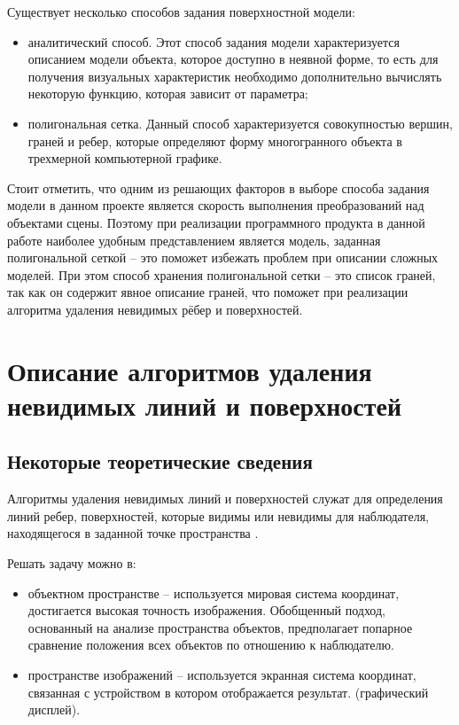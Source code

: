 Существует несколько способов задания поверхностной модели:
\begin{itemize} 
\item аналитический способ. Этот способ задания модели характеризуется описанием модели объекта, которое доступно в неявной форме, то есть для получения визуальных характеристик необходимо дополнительно вычислять некоторую функцию, которая зависит от параметра;

\item полигональная сетка. Данный способ характеризуется совокупностью вершин, граней и ребер, которые определяют форму многогранного объекта в трехмерной компьютерной графике.
\end{itemize}

Стоит отметить, что одним из решающих факторов в выборе способа задания модели в данном проекте является скорость выполнения преобразований над объектами сцены. Поэтому при реализации программного продукта в данной работе наиболее удобным представлением является модель, заданная полигональной сеткой -- это поможет избежать проблем при описании сложных моделей. При этом способ хранения полигональной сетки -- это список граней, так как он содержит явное описание граней, что поможет при реализации алгоритма удаления невидимых рёбер и поверхностей. 


\section{Описание алгоритмов удаления невидимых линий и поверхностей}

\subsection {Некоторые теоретические сведения}

Алгоритмы удаления невидимых линий и поверхностей служат для определения линий ребер, поверхностей, которые видимы или невидимы для наблюдателя, находящегося в заданной точке пространства \cite{rogers}.

Решать задачу можно в:
\begin{itemize}
	\item объектном пространстве -- используется мировая система координат, достигается высокая точность изображения. Обобщенный подход, основанный на анализе пространства объектов, предполагает попарное сравнение положения всех объектов по отношению к наблюдателю.
	\item пространстве изображений -- используется экранная система координат, связанная с устройством в котором отображается результат. (графический дисплей).
\end{itemize}

